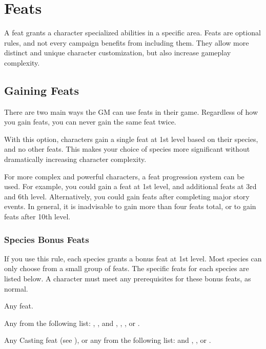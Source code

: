 \chapter{Feats}\label{Feats}

A feat grants a character specialized abilities in a specific area.
Feats are optional rules, and not every campaign benefits from including them.
They allow more distinct and unique character customization, but also increase gameplay complexity.

\section{Gaining Feats}
  There are two main ways the GM can use feats in their game.
  Regardless of how you gain feats, you can never gain the same feat twice.

  With this option, characters gain a single feat at 1st level based on their species, and no other feats.
  This makes your choice of species more significant without dramatically increasing character complexity.

  For more complex and powerful characters, a feat progression system can be used.
  For example, you could gain a feat at 1st level, and additional feats at 3rd and 6th level.
  Alternatively, you could gain feats after completing major story events.
  In general, it is inadvisable to gain more than four feats total, or to gain feats after 10th level.

  \subsection{Species Bonus Feats}\label{Species Bonus Feats}
    If you use this rule, each species grants a bonus feat at 1st level.
    Most species can only choose from a small group of feats.
    The specific feats for each species are listed below.
    A character must meet any prerequisites for these bonus feats, as normal.

     Any feat.

     Any from the following list: , ,  and , , , or .

     Any Casting feat (see ), or any from the following list:  and , , or .

